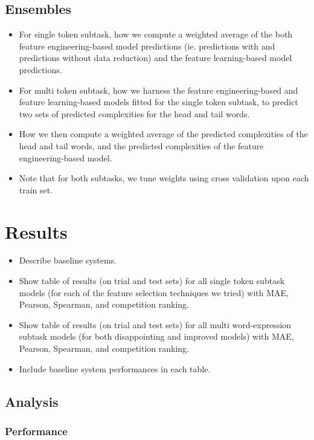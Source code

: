 \documentclass[11pt,a4paper]{article}
\begin{document}
\subsection{Ensembles}
\begin{itemize}
  \item For single token subtask, how we compute a weighted average of the both feature engineering-based model predictions (ie. predictions with and predictions without data reduction) and the feature learning-based model predictions.
  \item For multi token subtask, how we harness the feature engineering-based and feature learning-based models fitted for the single token subtask, to predict two sets of predicted complexities for the head and tail words.
  \item How we then compute a weighted average of the predicted complexities of the head and tail words, and the predicted complexities of the feature engineering-based model.
  \item Note that for both subtasks, we tune weights using cross validation upon each train set.
\end{itemize}

\section{Results}

\begin{itemize}
  \item Describe baseline systems.
  \item Show table of results (on trial and test sets) for all single token subtask models (for each of the feature selection techniques we tried) with MAE, Pearson, Spearman, and competition ranking.
  \item Show table of results (on trial and test sets) for all multi word-expression subtask models (for both disappointing and improved models) with MAE, Pearson, Spearman, and competition ranking.
  \item Include baseline system performances in each table.
\end{itemize}

\subsection{Analysis}

\subsubsection{Performance}
\end{document}
